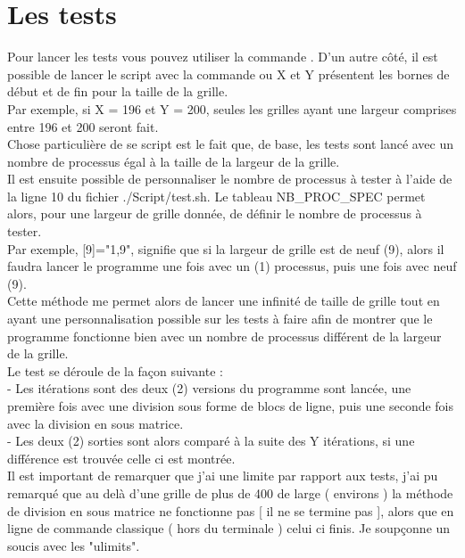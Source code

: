 \documentclass[10pt,a4paper]{article}
\begin{document}
\section{Les tests}
Pour lancer les tests vous pouvez utiliser la commande . D'un autre côté, il est possible de lancer le script avec la commande   ou X et Y présentent les bornes de début et de fin pour la taille de la grille. \\
Par exemple, si X = 196 et Y = 200, seules les grilles ayant une largeur comprises entre 196 et 200 seront fait. \\

Chose particulière de se script est le fait que, de base, les tests sont lancé avec un nombre de processus égal à la taille de la largeur de la grille.\\
Il est ensuite possible de personnaliser le nombre de processus à tester à l'aide de la ligne 10 du fichier ./Script/test.sh. Le tableau NB\_PROC\_SPEC permet alors, pour une largeur de grille donnée, de définir le nombre de processus à tester.\\
Par exemple, [9]="1,9", signifie que si la largeur de grille est de neuf (9), alors il faudra lancer le programme une fois avec un (1) processus, puis une fois avec neuf (9). \\
Cette méthode me permet alors de lancer une infinité de taille de grille tout en ayant une personnalisation possible sur les tests à faire afin de montrer que le programme fonctionne bien avec un nombre de processus différent de la largeur de la grille. \\

Le test se déroule de la façon suivante : \\
\indent - Les itérations sont des deux (2) versions du programme sont lancée, une première fois avec une division sous forme de blocs de ligne, puis une seconde fois avec la division en sous matrice. \\
\indent - Les deux (2) sorties sont alors comparé à la suite des Y itérations, si une différence est trouvée celle ci est montrée.\\

Il est important de remarquer que j'ai une limite par rapport aux tests, j'ai pu remarqué que au delà d'une grille de plus de 400 de large ( environs ) la méthode de division en sous matrice ne fonctionne pas [ il ne se termine pas ], alors que en ligne de commande classique ( hors du terminale ) celui ci finis. Je soupçonne un soucis avec les "ulimits". \\
\end{document}
